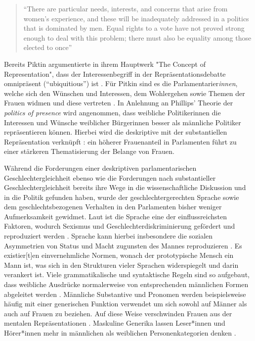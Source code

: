 \documentclass[12pt, 
    twoside=false, 
    bibliography=totoc, 
    numbers=endperiod, 
    headings=normal, 
    toc=chapterentrydotfill
    ]{scrbook}
\begin{document}
\begin{quote}
    \enquote{There are particular needs, interests, and concerns that arise from women's experience, and these will be inadequately addressed in a politics that is dominated by men. Equal rights to a vote have not proved strong enough to deal with this problem; there must also be equality among those elected to once} \parencite[66]{phillips_1998}
\end{quote}

Bereits Piktin \parencite*{pitkin_1972} argumentierte in ihrem Hauptwerk "The Concept of Representation", dass der Interessenbegriff in der Repräsentationsdebatte omnipräsent (\enquote{ubiquitious}) ist \parencite[69]{wangnerud_2000}. Für Pitkin sind es die Parlamentarier\emph{innen}, welche sich den Wünschen und Interessen, dem Wohlergehen sowie Themen der Frauen widmen und diese vertreten \parencites[vgl.][413]{blaxill_2016}{pitkin_1972}. In Anlehnung an Phillips' Theorie der \emph{politics of presence} \parencite*{phillips_1998} wird angenommen, dass weibliche Politikerinnen die Interessen und Wünsche weiblicher Bürgerinnen besser als männliche Politiker repräsentieren können. Hierbei wird die deskriptive mit der substantiellen Repräsentation verknüpft \parencite[52]{wangnerud_2009}: ein höherer Frauenanteil in Parlamenten führt zu einer stärkeren Thematisierung der Belange von Frauen.

Während die Forderungen einer deskriptiven parlamentarischen Geschlechtergleichheit ebenso wie die Forderungen nach substantieller Geschlechtergleichheit bereits ihre Wege in die wissenschaftliche Diskussion und in die Politik gefunden haben, wurde der geschlechtergerechten Sprache sowie dem geschlechtsbezogenen Verhalten in den Parlamenten bisher weniger Aufmerksamkeit gewidmet. 
Laut \textcite{menegatti_2017} ist die Sprache eine der einflussreichsten Faktoren, wodurch Sexismus und Geschlechterdiskriminierung gefördert und reproduziert werden \parencite*[1]{menegatti_2017}. Sprache kann hierbei insbesondere die sozialen Asymmetrien von Status und Macht zugunsten des Mannes reproduzieren \parencite[1]{menegatti_2017}. Es existier[t]en einvernehmliche Normen, wonach der prototypische Mensch ein Mann ist, was sich in den Strukturen vieler Sprachen widerspiegelt und darin verankert ist. Viele grammatikalische und syntaktische Regeln sind so aufgebaut, dass weibliche Ausdrücke normalerweise von entsprechenden männlichen Formen abgeleitet werden \parencite*[1]{menegatti_2017}. Männliche Substantive und Pronomen werden beispielsweise häufig mit einer generischen Funktion verwendet um sich sowohl auf Männer als auch auf Frauen zu beziehen. Auf diese Weise verschwinden Frauen aus der mentalen Repräsentationen \parencites{vaughan_2018}{stahlberg_2001}. Maskuline Generika lassen Leser*innen und Hörer*innen mehr in männlichen als weiblichen Personenkategorien denken \parencites[2]{sczesny_2016}{stahlberg_2007}.
\end{document}
